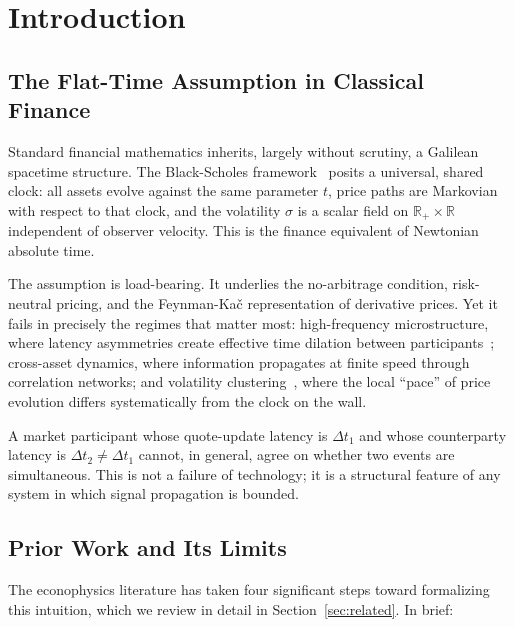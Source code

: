 \section{Introduction}
\label{sec:introduction}

\subsection{The Flat-Time Assumption in Classical Finance}

Standard financial mathematics inherits, largely without scrutiny, a Galilean
spacetime structure.  The Black-Scholes framework~\cite{Black1973} posits a
universal, shared clock: all assets evolve against the same parameter $t$,
price paths are Markovian with respect to that clock, and the volatility
$\sigma$ is a scalar field on $\mathbb{R}_+ \times \mathbb{R}$ independent of
observer velocity.  This is the finance equivalent of Newtonian absolute time.

The assumption is load-bearing.  It underlies the no-arbitrage condition,
risk-neutral pricing, and the Feynman-Ka\v{c} representation of derivative
prices.  Yet it fails in precisely the regimes that matter most: high-frequency
microstructure, where latency asymmetries create effective time dilation
between participants~\cite{WissnerGross2010}; cross-asset dynamics, where
information propagates at finite speed through correlation networks; and
volatility clustering~\cite{Engle1982}, where the local ``pace'' of price
evolution differs systematically from the clock on the wall.

A market participant whose quote-update latency is $\Delta t_1$ and whose
counterparty latency is $\Delta t_2 \neq \Delta t_1$ cannot, in general, agree
on whether two events are simultaneous.  This is not a failure of technology;
it is a structural feature of any system in which signal propagation is
bounded.

\subsection{Prior Work and Its Limits}

The econophysics literature has taken four significant steps toward
formalizing this intuition, which we review in detail in
Section~\ref{sec:related}.  In brief:


